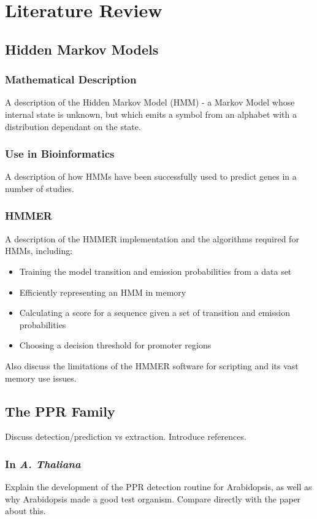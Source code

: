 
\chapter{Literature Review}
\label{chap:theory}

\section{Hidden Markov Models}
\label{sec:HMMs} 

\subsection{Mathematical Description}
\label{ssec:hmm_desc}

A description of the Hidden Markov Model (HMM) - a Markov Model whose internal
state is unknown, but which emits a symbol from an alphabet with a distribution
dependant on the state.

\subsection{Use in Bioinformatics}
\label{ssec:hmms_bioinformatics}

A description of how HMMs have been successfully used to predict genes in a
number of studies.

\subsection{HMMER}
\label{ssec:hmmer}

A description of the HMMER implementation and the algorithms required for HMMs,
including:
\begin{itemize}
  \item Training the model transition and emission probabilities from a data
    set
  \item Efficiently representing an HMM in memory
  \item Calculating a score for a sequence given a set of transition and
    emission probabilities
  \item Choosing a decision threshold for promoter regions
\end{itemize}

Also discuss the limitations of the HMMER software for scripting and its vast
memory use issues.

\section{The PPR Family}
\label{sec:review_PPR}

Discuss detection/prediction vs extraction. 
Introduce references.

\subsection{In \emph{A. Thaliana}}
\label{ssec:pprs_ara}

Explain the development of the PPR detection routine for Arabidopsis, as well
as why Arabidopsis made a good test organism.
Compare directly with the paper about this.




